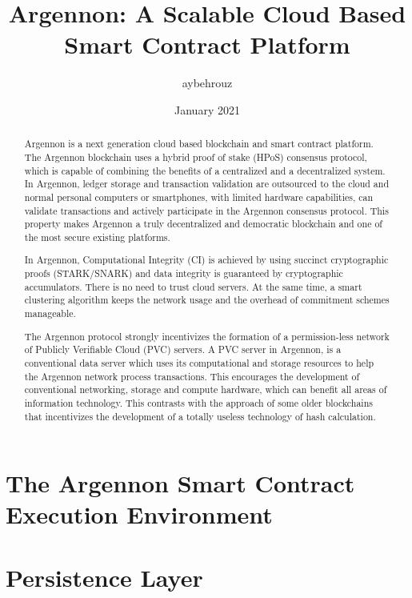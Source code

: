 \documentclass[11pt, a4paper]{report}
\title{Argennon: A Scalable Cloud Based Smart Contract Platform}
\author{aybehrouz}
\date{January 2021}
\begin{document}
    \maketitle
    \begin{abstract}
        Argennon is a next generation cloud based blockchain and smart
        contract platform. The Argennon blockchain uses
        a hybrid proof of stake (HPoS) consensus protocol, which is capable of combining the benefits of
        a centralized and a decentralized system. In Argennon, ledger storage and transaction validation are
        outsourced to the cloud and normal personal computers or smartphones, with limited hardware
        capabilities, can validate transactions and actively
        participate in the Argennon consensus protocol. This property makes Argennon a truly decentralized and
        democratic blockchain and one of the most secure existing platforms.

        In Argennon, Computational Integrity (CI) is achieved by using succinct cryptographic proofs (STARK/SNARK)
        and data integrity is guaranteed by cryptographic accumulators. There is no need to trust cloud servers.
        At the same time, a smart clustering algorithm keeps
        the network usage and the overhead of commitment schemes manageable.

        The Argennon protocol strongly incentivizes the formation of a permission-less network of Publicly Verifiable
        Cloud (PVC) servers. A PVC server in Argennon, is a conventional data server which uses its computational and
        storage resources to help the Argennon network process transactions. This encourages the development
        of conventional networking, storage and compute hardware, which can benefit all areas of information technology.
        This contrasts with the approach of some older blockchains that incentivizes the development of a totally
        useless technology of hash calculation.

    \end{abstract}
    \tableofcontents


    \chapter{The Argennon Smart Contract Execution Environment}\label{ch:AVM}
    


    \chapter{Persistence Layer}\label{ch:persistance}
    
\end{document}
